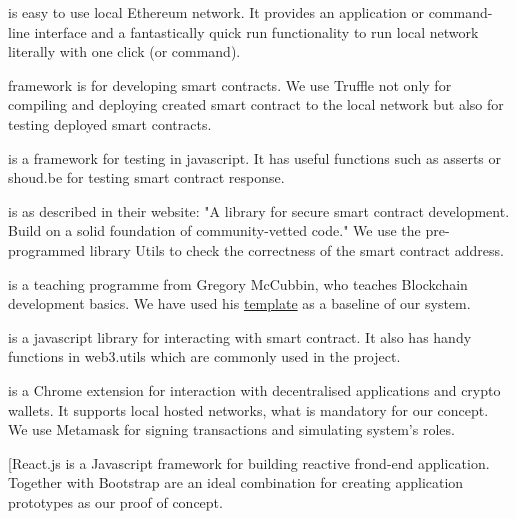 \documentclass[thesis=M,english]{FITthesis}[2019/12/23]
\begin{document}
\begin{description}
    
\item[Ganache \cite{ganache}] is easy to use local Ethereum network. It provides an application or command-line interface and a fantastically quick run functionality to run local network literally with one click (or command).

\item[Truffle \cite{truffle}] framework is for developing smart contracts. We use Truffle not only for compiling and deploying created smart contract to the local network but also for testing deployed smart contracts.

\item[Chai.js \cite{chai}]is a framework for testing in javascript. It has useful functions such as asserts or shoud.be for testing smart contract response.

\item[OpenZeppeline] is as described in their website: "A library for secure smart contract development. Build on a solid foundation of community-vetted code."\cite{openeZeppelin} We use the pre-programmed library Utils to check the correctness of the smart contract address.

\item[dApp university \cite{dappUniversity}]  is a teaching programme from Gregory McCubbin, who teaches Blockchain development basics. We have used his \href{https://github.com/dappuniversity/social-network/releases/tag/28e13af}{template} as a baseline of our system. 

\item[Web3.js \cite{web3js}]is a javascript library for interacting with smart contract. It also has handy functions in web3.utils which are commonly used in the project. 

\item[Metamask \cite{metamaskWeb}] is a Chrome extension for interaction with decentralised applications and crypto wallets. It supports local hosted networks, what is mandatory for our concept. We use Metamask for signing transactions and simulating system's roles.

\item[React.js \cite{react} is a Javascript framework for building reactive frond-end application. Together with Bootstrap are an ideal combination for creating application prototypes as our proof of concept.

\end{description}
\end{document}
